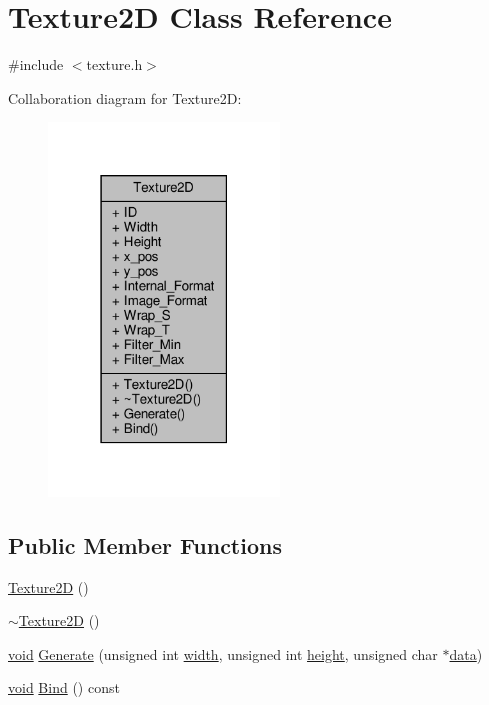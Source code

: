 \hypertarget{classTexture2D}{}\section{Texture2D Class Reference}
\label{classTexture2D}


{\ttfamily \#include $<$texture.\+h$>$}



Collaboration diagram for Texture2D\+:
\nopagebreak
\begin{figure}[H]
\begin{center}
\leavevmode
\includegraphics[width=174pt]{classTexture2D__coll__graph}
\end{center}
\end{figure}
\subsection*{Public Member Functions}
\begin{DoxyCompactItemize}
\item 
\hyperlink{classTexture2D_ab62c7c5172a4800b4629cd475147819d}{Texture2D} ()
\item 
\hyperlink{classTexture2D_a84210f27b55799a096b8abc36380a077}{$\sim$\+Texture2D} ()
\item 
\hyperlink{imgui__impl__opengl3__loader_8h_ac668e7cffd9e2e9cfee428b9b2f34fa7}{void} \hyperlink{classTexture2D_a29768bc9e468322d8b6b86374890c2cc}{Generate} (unsigned int \hyperlink{imgui__impl__opengl3__loader_8h_a6879d830f164725df67adeeabca3ea47}{width}, unsigned int \hyperlink{imgui__impl__opengl3__loader_8h_a60075de22f90a1223dc0bea98d2ee4d5}{height}, unsigned char $\ast$\hyperlink{imgui__impl__opengl3__loader_8h_abd87654504355b4c1bb002dcb1d4d16a}{data})
\item 
\hyperlink{imgui__impl__opengl3__loader_8h_ac668e7cffd9e2e9cfee428b9b2f34fa7}{void} \hyperlink{classTexture2D_a97cc1e27512b8f520a59473e6657d7d9}{Bind} () const
\end{DoxyCompactItemize}
